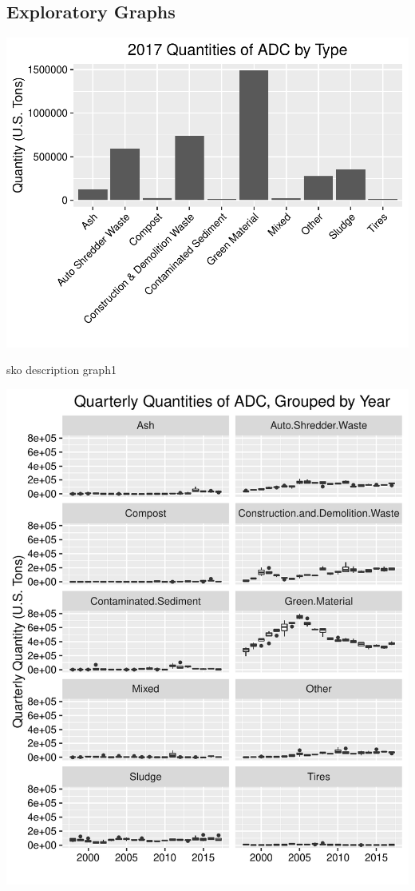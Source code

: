 \documentclass[12pt,]{article}
\begin{document}
\subsection{Exploratory Graphs}\label{exploratory-graphs}

\includegraphics{SKo_Project_Template_files/figure-latex/explore_graphs2-1.pdf}

sko description graph1

\includegraphics{SKo_Project_Template_files/figure-latex/explore_graphs3-1.pdf}
\end{document}
